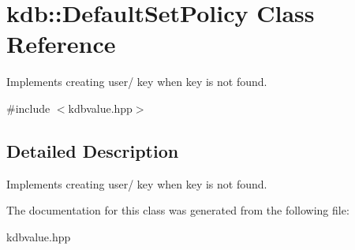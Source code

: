 \hypertarget{classkdb_1_1DefaultSetPolicy}{\section{kdb\+:\+:Default\+Set\+Policy Class Reference}
\label{classkdb_1_1DefaultSetPolicy}
}


Implements creating user/ key when key is not found.  




{\ttfamily \#include $<$kdbvalue.\+hpp$>$}



\subsection{Detailed Description}
Implements creating user/ key when key is not found. 

The documentation for this class was generated from the following file\+:\begin{DoxyCompactItemize}
\item 
kdbvalue.\+hpp\end{DoxyCompactItemize}
